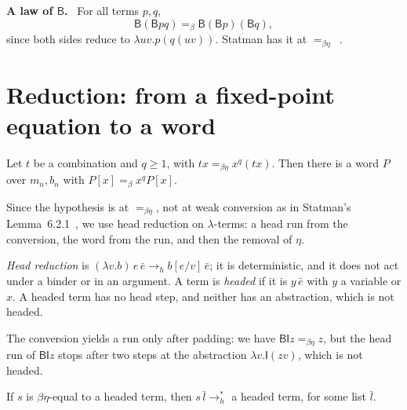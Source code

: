 \documentclass[a4paper,english]{lipics-v2021}
\newcommand{\B}{\mathsf{B}}
\newcommand{\I}{\mathsf{I}}
\newcommand{\hred}{\to_{h}}
\newcommand{\eqb}{=_{\beta}}
\newcommand{\eqbe}{=_{\beta\eta}}
\newcommand{\runin}[1]{\par\smallskip\noindent\textbf{#1}\ }
\begin{document}
\runin{A law of $\B$.} For all terms $p,q$,
\begin{equation}\label{eq:dist}
\B(\B pq) \eqb \B(\B p)(\B q),
\end{equation}
since both sides reduce to $\lambda uv.p(q(uv))$. Statman has it at $\eqbe$~\cite[Fact~2]{statman2017}.

\section{Reduction: from a fixed-point equation to a word}\label{sec:partA}

\begin{proposition}\label{prop:A}
Let $t$ be a combination and $q \geq 1$, with $tx \eqbe x^q(tx)$. Then there is a word $P$ over $m_n,b_n$ with $P[x] \eqb x^qP[x]$.
\end{proposition}

Since the hypothesis is at $\eqbe$, not at weak conversion as in Statman's Lemma~6.2.1~\cite{statman2017}, we use head reduction on $\lambda$-terms: a head run from the conversion, the word from the run, and then the removal of $\eta$.

\emph{Head reduction} is $(\lambda v.b)\,e\,\bar e \hred b[e/v]\,\bar e$; it is deterministic, and it does not act under a binder or in an argument. A term is \emph{headed} if it is $y\,\bar e$ with $y$ a variable or $x$. A headed term has no head step, and neither has an abstraction, which is not headed.

The conversion yields a run only after padding: we have $\B\I z \eqbe z$, but the head run of $\B\I z$ stops after two steps at the abstraction $\lambda v.\I(zv)$, which is not headed.

\begin{lemma}\label{lem:reach}
If $s$ is $\beta\eta$-equal to a headed term, then $s\,\bar l \hred^*$ a headed term, for some list $\bar l$.
\end{lemma}
\end{document}
